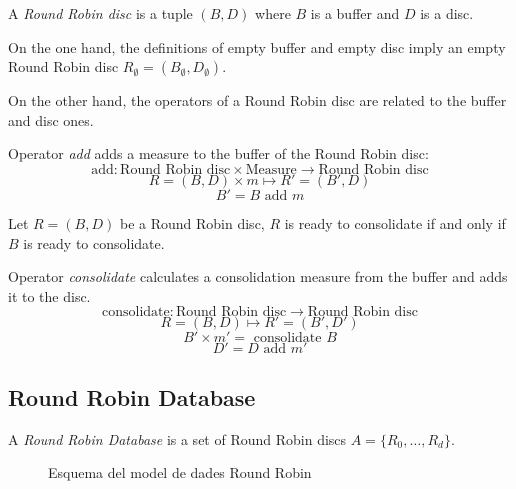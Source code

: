 \begin{definition}
  A \emph{Round Robin disc} is a tuple $(B,D)$ where $B$
  is a buffer and $D$ is a disc.
\end{definition}
 
On the one hand, the definitions of empty buffer and empty disc imply
an empty Round Robin disc $R_{\emptyset} = (B_{\emptyset},D_{\emptyset})$.

On the other hand, the operators of a Round Robin disc are related to
the buffer and disc ones.

\begin{definition}
  Operator \emph{add} adds a measure  to the buffer of the Round Robin disc:
  \[
  \text{add}: \text{Round Robin disc} \times \text{Measure}
  \longrightarrow \text{Round Robin disc}
  \]
  \[
  R=(B,D) \times m \mapsto R'= (B',D)
  \]
  \[
  B'= B \text{ add } m
  \]
\end{definition}

\begin{definition}
  Let $R=(B,D)$ be a Round Robin disc, $R$ is ready to consolidate if
  and only if $B$ is ready to consolidate.
\end{definition}

\begin{definition}
  Operator \emph{consolidate} calculates a consolidation measure from
  the buffer and adds it to the disc.
  \[
  \text{consolidate}: \text{Round Robin disc} \longrightarrow
  \text{Round Robin disc}
  \]
  \[
  R=(B,D) \mapsto R'= (B',D')
  \]
  \[
  B' \times m'= \text{ consolidate } B 
  \]
  \[
  D'= D \text{ add } m'
  \]
\end{definition}



\subsection{Round Robin Database}\label{sec:model:rrd}

\begin{definition}
  A \emph{Round Robin Database} is a set of Round Robin discs
  $A=\{R_0,\ldots,R_d\}$.
\end{definition}


\begin{figure}[htp]
\centering
\setlength{\unitlength}{0.4mm}

\caption{Esquema del model de dades Round Robin}
\label{fig:model:esquemarrd}
\end{figure}
  
